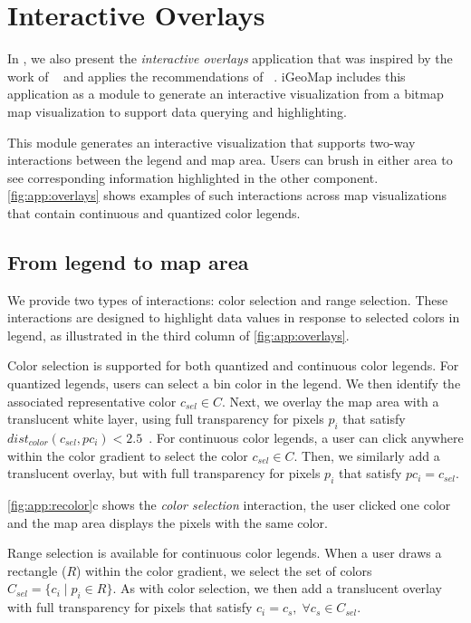 \section{Interactive Overlays}
\label{sec:app_overlays}
In \citep{Poco2017a}, we also present the \textit{interactive overlays} application that was inspired by the work of \citeauthor{Kong2012}~\citep{Kong2012} and applies the recommendations of \citeauthor{Cleveland1984}~\citep{Cleveland1984}. iGeoMap includes this application as a module to generate an interactive visualization from a bitmap map visualization to support data querying and highlighting.

This module generates an interactive visualization that supports two-way interactions between the legend and map area. Users can brush in either area to see corresponding information highlighted in the other component.
\autoref{fig:app:overlays} shows examples of such interactions across map visualizations that contain continuous and quantized color legends.

\figAppOverlays


\subsection*{From legend to map area}
We provide two types of interactions: color selection and range selection. These interactions are designed to highlight data values in response to selected colors in legend, as illustrated in the third column of \autoref{fig:app:overlays}.

Color selection is supported for both quantized and continuous color legends.
%
For quantized legends, users can select a bin color in the legend. We then identify the associated representative color $c_{sel}\in C$. Next, we overlay the map area with a translucent white layer, using full transparency for pixels $p_i$ that satisfy $dist_{color}(c_{sel}, pc_i) < 2.5$~\citep{Stokes1992}.
%
For continuous color legends, a user can click anywhere within the color gradient to select the color $c_{sel}\in C$. Then, we similarly add a translucent overlay, but with full transparency for pixels $p_i$ that satisfy $pc_i = c_{sel}$.

\autoref{fig:app:recolor}c shows the \textit{color selection}  interaction, the user clicked one color and the map area displays the pixels with the same color.


Range selection is available for continuous color legends. When a user draws a rectangle ($R$) within the color gradient, we select the set of colors $C_{sel}=\{c_i\;|\;p_i \in R\}$.
As with color selection, we then add a translucent overlay with full transparency for pixels that satisfy $c_i=c_s,\; \forall c_s \in C_{sel}$.

